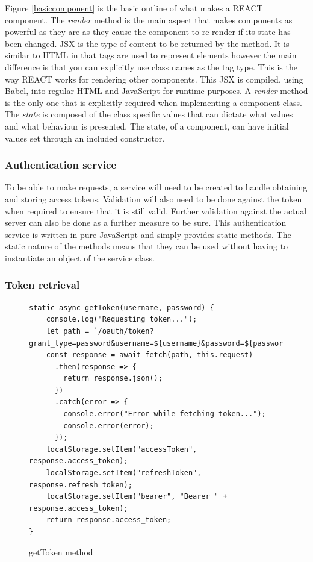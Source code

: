 Figure \ref{basiccomponent} is the basic outline of what makes a REACT component.
The \textit{render} method is the main aspect that makes components as powerful as they are as they cause the component to re-render 
if its state has been changed.
JSX is the type of content to be returned by the method.
It is similar to HTML in that tags are used to represent elements however the main difference is that you can explicitly use class
names as the tag type. This is the way REACT works for rendering other components.
This JSX is compiled, using Babel, into regular HTML and JavaScript for runtime purposes.
A \textit{render} method is the only one that is explicitly required when implementing a component class.
The \textit{state} is composed of the class specific values that can dictate what values and what behaviour is presented.
The state, of a component, can have initial values set through an included constructor.


\subsubsection{Authentication service}
To be able to make requests, a service will need to be created to handle obtaining and storing access tokens.
Validation will also need to be done against the token when required to ensure that it is still valid.
Further validation against the actual server can also be done as a further measure to be sure.
This authentication service is written in pure JavaScript and simply provides static methods.
The static nature of the methods means that they can be used without having to instantiate an object of the service class.

\subsubsection*{Token retrieval}

\begin{figure}[ht]
    \centering
    \begin{lstlisting}
static async getToken(username, password) {
    console.log("Requesting token...");
    let path = `/oauth/token?grant_type=password&username=${username}&password=${password}`;
    const response = await fetch(path, this.request)
      .then(response => {
        return response.json();
      })
      .catch(error => {
        console.error("Error while fetching token...");
        console.error(error);
      });
    localStorage.setItem("accessToken", response.access_token);
    localStorage.setItem("refreshToken", response.refresh_token);
    localStorage.setItem("bearer", "Bearer " + response.access_token);
    return response.access_token;
}
    \end{lstlisting}
    \caption{getToken method}
    \label{gettokenmethod}
\end{figure}

